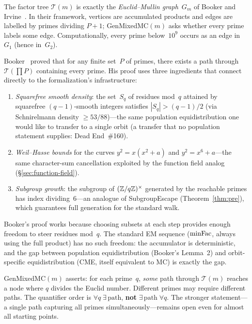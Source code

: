 \begin{remark}
\label{rem:em-graph}
The factor tree $\mathcal{T}(m)$ is exactly the \emph{Euclid--Mullin
graph}~$G_m$ of Booker and Irvine~\cite{BoIr2016}.  In their
framework, vertices are accumulated products and edges are labelled by
primes dividing $P{+}1$; GenMixedMC$(m)$ asks whether every prime
labels some edge.  Computationally, every prime below~$10^9$ occurs as
an edge in~$G_1$ (hence in~$G_2$).

Booker~\cite{BoSa2012} proved that for any finite set~$P$ of primes,
there exists a path through $\mathcal{T}(\prod P)$ containing every
prime.  His proof uses three ingredients that connect directly to the
formalization's infrastructure:
\begin{enumerate}[nosep]
\item \emph{Squarefree smooth density}:
  the set~$S_q$ of residues mod~$q$ attained by squarefree
  $(q{-}1)$-smooth integers satisfies $|S_q| > (q{-}1)/2$
  (via Schnirelmann density $\geq 53/88$)---the same population
  equidistribution one would like to transfer to a single orbit
  (a transfer that no population statement supplies: Dead End~\#160).
\item \emph{Weil--Hasse bounds} for the curves $y^2 = x(x^2+a)$
  and $y^2 = x^6+a$---the same character-sum cancellation exploited
  by the function field analog (\S\ref{sec:function-field}).
\item \emph{Subgroup growth}: the subgroup of $(\mathbb{Z}/q\mathbb{Z})^\times$
  generated by the reachable primes has index dividing~$6$---an
  analogue of SubgroupEscape (Theorem~\ref{thm:pre}), which guarantees
  full generation for the standard walk.
\end{enumerate}
Booker's proof works because choosing subsets at each step provides
enough freedom to steer residues mod~$q$.  The standard EM sequence
($\mathrm{minFac}$, always using the full product) has no such freedom: the
accumulator is deterministic, and the gap between population
equidistribution (Booker's Lemma~2) and orbit-specific
equidistribution (CME, itself equivalent to MC) is exactly the gap.
\end{remark}

\begin{remark}
\label{rem:quantifier}
GenMixedMC$(m)$ asserts: for each prime~$q$, \emph{some} path
through $\mathcal{T}(m)$ reaches a node where $q$ divides the Euclid
number.  Different primes may require different paths.  The quantifier
order is $\forall q\;\exists\,\text{path}$, \textbf{not}
$\exists\,\text{path}\;\forall q$.  The stronger statement---a single
path capturing all primes simultaneously---remains open even for
almost all starting points.
\end{remark}

